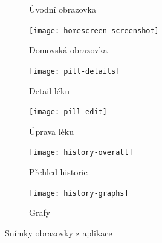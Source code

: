 \documentclass[../TakeYourPill.tex]{subfiles}
\begin{document}
\begin{figure}[h]
\begin{subfigure}[b]{.3\textwidth}
    \caption{Úvodní obrazovka}
    \label{fig:intro}
  \end{subfigure}
  \hfill
  \begin{subfigure}[b]{.3\textwidth}
    \centering
    \texttt{[image: homescreen-screenshot]}
    \caption{Domovská obrazovka}
    \label{fig:homescreen}
  \end{subfigure}
  \hfill
  \begin{subfigure}[b]{.3\textwidth}
    \centering
    \texttt{[image: pill-details]}
    \caption{Detail léku}
    \label{fig:details}
  \end{subfigure}
  \hfill
  \vfill
  \vspace{6pt}
  \hfill
  \begin{subfigure}[b]{.3\textwidth}
    \centering
    \texttt{[image: pill-edit]}
    \caption{Úprava léku}
    \label{fig:edit}
  \end{subfigure}
  \hfill
  \begin{subfigure}[b]{.3\textwidth}
    \centering
    \texttt{[image: history-overall]}
    \caption{Přehled historie}
    \label{fig:history}
  \end{subfigure}
  \hfill
  \begin{subfigure}[b]{.3\textwidth}
    \centering
    \texttt{[image: history-graphs]}
    \caption{Grafy}
    \label{fig:graphs}
  \end{subfigure}
  \hfill
  \vfill
\caption{Snímky obrazovky z  aplikace}
\label{fig:screenshots}
\end{figure}
\end{document}
